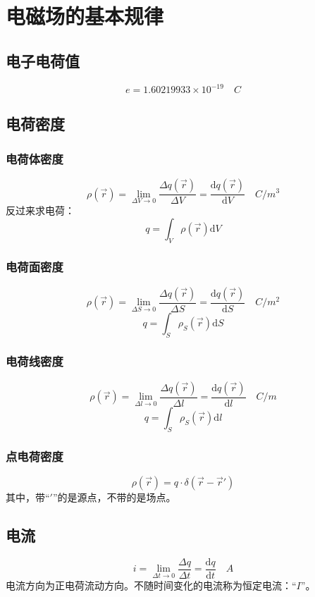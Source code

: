 \chapter{电磁场的基本规律}

\section{电子电荷值}
$$ e = 1.60219933 \times 10^{-19} \quad C $$

\section{电荷密度}

\subsection*{电荷体密度}
$$ \rho(\vec r) = \lim\limits_{\Delta V \to 0} \frac{\Delta q(\vec{r})}{\Delta V} = \frac{\mathrm{d}q(\vec{r})}{\mathrm{d}V} \quad C/m^3$$
反过来求电荷：
$$ q = \int_V \rho(\vec{r}) \mathrm{d}V $$

\subsection*{电荷面密度}
$$ \rho(\vec r) = \lim\limits_{\Delta S \to 0} \frac{\Delta q(\vec{r})}{\Delta S} = \frac{\mathrm{d}q(\vec{r})}{\mathrm{d}S} \quad C/m^2$$
$$ q = \int_S \rho_S(\vec{r}) \mathrm{d}S $$

\subsection*{电荷线密度}
$$ \rho(\vec r) = \lim\limits_{\Delta l \to 0} \frac{\Delta q(\vec{r})}{\Delta l} = \frac{\mathrm{d}q(\vec{r})}{\mathrm{d}l} \quad C/m$$
$$ q = \int_S \rho_S(\vec{r}) \mathrm{d}l $$

\subsection*{点电荷密度}
$$ \rho(\vec{r}) = q \cdot \delta(\vec{r} - \vec{r}') $$
其中，带“$'$”的是源点，不带的是场点。

\section{电流}
$$ i = \lim\limits_{\Delta t \to 0} \frac{\Delta q}{\Delta t} = \frac{\mathrm{d}q}{\mathrm{d}t} \quad A$$
电流方向为正电荷流动方向。不随时间变化的电流称为恒定电流：“$I$”。

